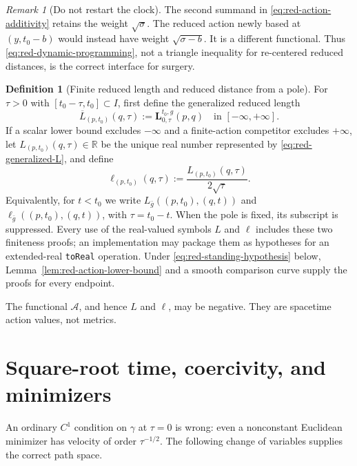 \documentclass[10pt]{coll-l}
\theoremstyle{definition}
\newtheorem{definition}[theorem]{Definition}
\theoremstyle{remark}
\newtheorem{remark}[theorem]{Remark}
\numberwithin{section}{chapter}
\numberwithin{equation}{chapter}
\begin{document}
\begin{remark}[Do not restart the clock]
\label{rem:red-do-not-restart-clock}
The second summand in \eqref{eq:red-action-additivity} retains the weight
$\sqrt\sigma$.  The reduced action newly based at $(y,t_0-b)$ would instead
have weight $\sqrt{\sigma-b}$.  It is a different functional.  Thus
\eqref{eq:red-dynamic-programming}, not a triangle inequality for re-centered
reduced distances, is the correct interface for surgery.
\end{remark}

\begin{definition}[Finite reduced length and reduced distance from a pole]
\label{def:red-distance}
For $\tau>0$ with $[t_0-\tau,t_0]\subset I$, first define the generalized
reduced length
\begin{equation}
 \overline L_{(p,t_0)}(q,\tau)
 :=\mathbf L^{t_0,g}_{0,\tau}(p,q)
 \quad\text{in }[-\infty,+\infty].                    \label{eq:red-generalized-L}
\end{equation}
If a scalar lower bound excludes $-\infty$ and a finite-action competitor
excludes $+\infty$, let $L_{(p,t_0)}(q,\tau)\in\mathbb R$ be the unique real
number represented by \eqref{eq:red-generalized-L}, and define
\begin{equation}
 \ell_{(p,t_0)}(q,\tau)
 :=\frac{L_{(p,t_0)}(q,\tau)}{2\sqrt\tau}.              \label{eq:red-L-ell}
\end{equation}
Equivalently, for $t<t_0$ we write
$L_{\bar g}((p,t_0),(q,t))$ and
$\ell_{\bar g}((p,t_0),(q,t))$, with $\tau=t_0-t$.
When the pole is fixed, its subscript is suppressed.  Every use of the
real-valued symbols $L$ and $\ell$ includes these two finiteness proofs; an
implementation may package them as hypotheses for an extended-real
\texttt{toReal} operation.  Under \eqref{eq:red-standing-hypothesis} below,
Lemma~\ref{lem:red-action-lower-bound} and a smooth comparison curve supply
the proofs for every endpoint.
\end{definition}

The functional $\mathcal A$, and hence $L$ and $\ell$, may be negative.
They are spacetime action values, not metrics.

\section{Square-root time, coercivity, and minimizers}
\label{sec:red-minimizers}

An ordinary $C^1$ condition on $\gamma$ at $\tau=0$ is wrong: even a
nonconstant Euclidean minimizer has velocity of order $\tau^{-1/2}$.  The
following change of variables supplies the correct path space.
\end{document}
